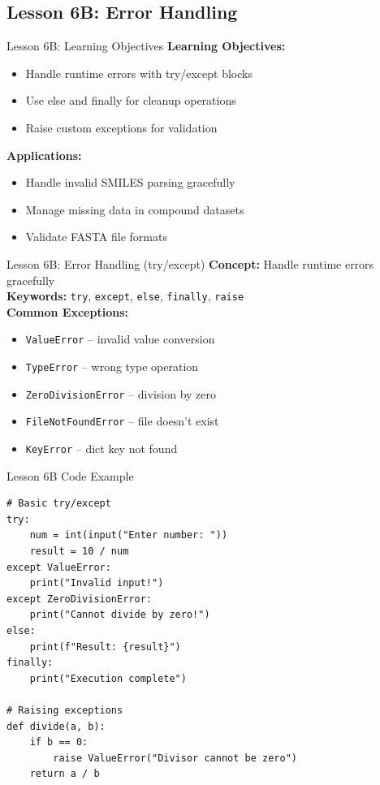 \documentclass{beamer}
\begin{document}
\subsection{Lesson 6B: Error Handling}

\begin{frame}{Lesson 6B: Learning Objectives}
    \small
    \textbf{Learning Objectives:}
    \begin{itemize}
        \item Handle runtime errors with try/except blocks
        \item Use else and finally for cleanup operations
        \item Raise custom exceptions for validation
    \end{itemize}
    \vspace{0.5em}
    \textbf{Applications:}
    \begin{itemize}
        \item Handle invalid SMILES parsing gracefully
        \item Manage missing data in compound datasets
        \item Validate FASTA file formats
    \end{itemize}
\end{frame}

\begin{frame}{Lesson 6B: Error Handling (try/except)}
    \small
    \textbf{Concept:} Handle runtime errors gracefully\\[0.5em]
    \textbf{Keywords:} \texttt{try}, \texttt{except}, \texttt{else}, \texttt{finally}, \texttt{raise}\\[0.5em]
    \textbf{Common Exceptions:}
    \begin{itemize}
        \item \texttt{ValueError} -- invalid value conversion
        \item \texttt{TypeError} -- wrong type operation
        \item \texttt{ZeroDivisionError} -- division by zero
        \item \texttt{FileNotFoundError} -- file doesn't exist
        \item \texttt{KeyError} -- dict key not found
    \end{itemize}
\end{frame}

\begin{frame}[fragile]{Lesson 6B Code Example}
    \small
    \begin{lstlisting}[style=codeStyle]
# Basic try/except
try:
    num = int(input("Enter number: "))
    result = 10 / num
except ValueError:
    print("Invalid input!")
except ZeroDivisionError:
    print("Cannot divide by zero!")
else:
    print(f"Result: {result}")
finally:
    print("Execution complete")

# Raising exceptions
def divide(a, b):
    if b == 0:
        raise ValueError("Divisor cannot be zero")
    return a / b
    \end{lstlisting}
\end{frame}
\end{document}
